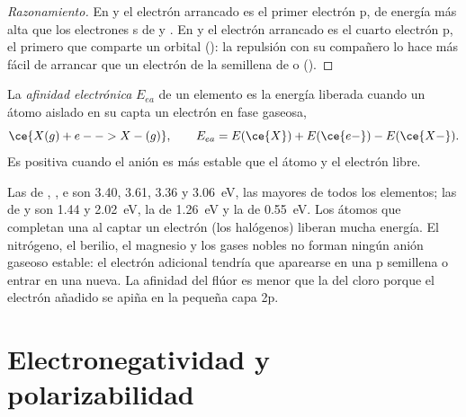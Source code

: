 \begin{proof}[Razonamiento]
En  y  el electrón arrancado es el primer electrón p, de
energía más alta que los electrones s de  y . En  y
 el electrón arrancado es el cuarto electrón p, el primero que
comparte un orbital (): la repulsión con su compañero lo
hace más fácil de arrancar que un electrón de la  semillena de
 o  ().
\end{proof}

\begin{definition}\label{def:b1:periodicity:electron-affinity}
La \emph{afinidad electrónica} $E_{ea}$ de un
elemento es la energía liberada cuando un átomo aislado en su  capta un electrón en fase gaseosa,
\[
  \ce{X(g) + e- -> X-(g)}, \qquad E_{ea} = E(\ce{X}) + E(\ce{e-}) - E(\ce{X-}) .
\]
Es positiva cuando el anión es más estable que el átomo y el electrón
libre.
\end{definition}

\begin{example}\label{ex:b1:periodicity:ea}
Las  de , ,  e  son
3.40, 3.61, 3.36 y \qty{3.06}{eV}, las mayores de todos los elementos;
las de  y  son 1.44 y \qty{2.02}{eV}, la de 
\qty{1.26}{eV} y la de  \qty{0.55}{eV}. Los átomos que completan
una  al captar un electrón (los halógenos) liberan mucha energía.
El nitrógeno, el berilio, el magnesio y los gases nobles no forman ningún
anión gaseoso estable: el electrón adicional tendría que aparearse en una
 p semillena o entrar en una  nueva. La afinidad del flúor
es menor que la del cloro porque el electrón añadido se apiña en la
pequeña capa 2p.
\end{example}

\section{Electronegatividad y polarizabilidad}

